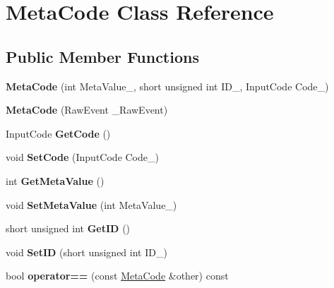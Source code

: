 \hypertarget{classMetaCode}{
\section{MetaCode Class Reference}
\label{d7/d72/classMetaCode}
}
\subsection*{Public Member Functions}
\begin{DoxyCompactItemize}
\item 
\hypertarget{classMetaCode_a76bba215580768ab22c505ea18b2ec6d}{
{\bfseries MetaCode} (int MetaValue\_\-, short unsigned int ID\_\-, InputCode Code\_\-)}
\label{d7/d72/classMetaCode_a76bba215580768ab22c505ea18b2ec6d}

\item 
\hypertarget{classMetaCode_ad0a739796fa1de2991c196d8ee7b19b2}{
{\bfseries MetaCode} (RawEvent \_\-RawEvent)}
\label{d7/d72/classMetaCode_ad0a739796fa1de2991c196d8ee7b19b2}

\item 
\hypertarget{classMetaCode_a9438d04aa38086baa1c5ccd79510c0fb}{
InputCode {\bfseries GetCode} ()}
\label{d7/d72/classMetaCode_a9438d04aa38086baa1c5ccd79510c0fb}

\item 
\hypertarget{classMetaCode_a24f0c5469a12ccc59fcf3b830e6cfc27}{
void {\bfseries SetCode} (InputCode Code\_\-)}
\label{d7/d72/classMetaCode_a24f0c5469a12ccc59fcf3b830e6cfc27}

\item 
\hypertarget{classMetaCode_a6a33ef9b7e2414ecfd97aadb14eca2de}{
int {\bfseries GetMetaValue} ()}
\label{d7/d72/classMetaCode_a6a33ef9b7e2414ecfd97aadb14eca2de}

\item 
\hypertarget{classMetaCode_a308404d4eb64627d02ab41dd5029c9c8}{
void {\bfseries SetMetaValue} (int MetaValue\_\-)}
\label{d7/d72/classMetaCode_a308404d4eb64627d02ab41dd5029c9c8}

\item 
\hypertarget{classMetaCode_a4556130570fdc8bf531be7f15519fafe}{
short unsigned int {\bfseries GetID} ()}
\label{d7/d72/classMetaCode_a4556130570fdc8bf531be7f15519fafe}

\item 
\hypertarget{classMetaCode_ae39bd781449cc01d7bce48c1e9da089d}{
void {\bfseries SetID} (short unsigned int ID\_\-)}
\label{d7/d72/classMetaCode_ae39bd781449cc01d7bce48c1e9da089d}

\item 
\hypertarget{classMetaCode_a296b774682a9326494e0c2d1b357ec2a}{
bool {\bfseries operator==} (const \hyperlink{classMetaCode}{MetaCode} \&other) const }
\label{d7/d72/classMetaCode_a296b774682a9326494e0c2d1b357ec2a}

\end{DoxyCompactItemize}


